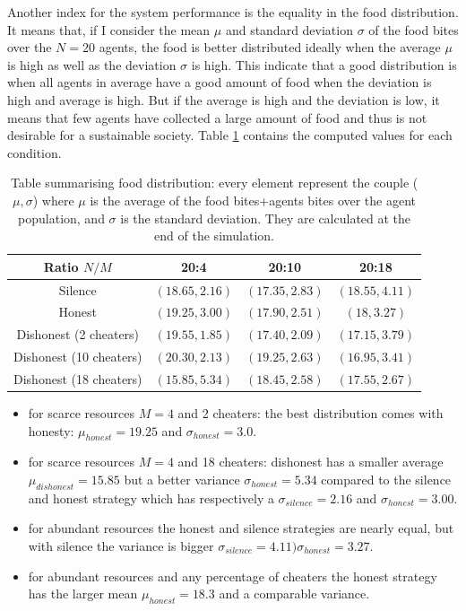 Another index for the system performance is the equality in the food distribution. 
It means that, if I consider the mean $\mu$ and standard deviation $\sigma$ of 
the food bites over the $N=20$ agents, the food is better distributed ideally when 
the average $\mu$ is high as well as the deviation $\sigma$ is high. 
This indicate that a good distribution is when all agents in average have a good amount of food when the deviation
is high and average is high.
But if the average is high and the deviation is low, it means that few agents have
collected a large amount of food and thus is not desirable for a sustainable society.
Table \ref{tab:foodDistribution} contains the computed values for each condition.

\begin{table}[htbp]
\caption[Social System food distribution]{Table summarising food distribution:
every element represent the couple ($\mu,\sigma$) where $\mu$ is the average of
the food bites+agents bites over the agent population, and $\sigma$ is
the standard deviation. They are calculated at the end of the simulation.\label{tab:foodDistribution}}
\begin{center}
\small{
\begin{tabular}{@{}c|ccc@{}}
\hline
Ratio $N/M$ & 20:4 & 20:10 & 20:18\\
\hline
Silence & $(18.65,2.16)$ & $(17.35,2.83)$ & $(18.55,4.11)$\\
\hline
Honest & $(19.25,3.00)$ & $(17.90,2.51)$ & $(18,3.27)$\\
\hline
Dishonest (2 cheaters) & $(19.55,1.85)$  & $(17.40,2.09)$   & $(17.15,3.79)$\\
Dishonest (10 cheaters) & $(20.30,2.13)$  & $(19.25,2.63)$  & $(16.95,3.41)$\\
Dishonest (18 cheaters) & $(15.85,5.34)$ & $(18.45,2.58)$  & $(17.55,2.67)$\\
\end{tabular}
}
\end{center}
\end{table}

\begin{itemize}
\item for scarce resources $M=4$ and 2 cheaters: the best distribution comes 
with honesty:  $\mu_{honest}=19.25$ and $\sigma_{honest}=3.0$.
\item for scarce resources $M=4$ and 18 cheaters: dishonest has a smaller 
average  $\mu_{dishonest}=15.85$ but a better variance $\sigma_{honest}=5.34$ 
compared to the silence and honest strategy which has respectively a $\sigma_{silence}=2.16$ 
and $\sigma_{honest}=3.00$.
\item for abundant resources the honest and silence strategies are nearly equal, 
but with silence the variance is bigger $\sigma_{silence}=4.11)\sigma_{honest}=3.27$.
\item for abundant resources and any percentage of cheaters the honest strategy 
has the larger mean $\mu_{honest}=18.3$ and a comparable variance.
\end{itemize}


